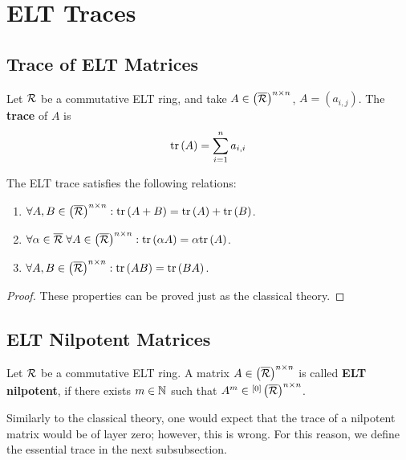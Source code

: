 \section{ELT Traces}
\subsection{Trace of ELT Matrices}
\begin{defn}
Let $\mathcal{R}$ be a commutative ELT ring, and take $A\in \left(\overline{\mathcal{R}}\right)^{n\times n}$, $A=\left(a_{i,j}\right)$. The \textbf{trace} of $A$ is
$$\textnormal{tr}\left(A\right)=\sum_{i=1}^{n}a_{i,i}$$
\end{defn}

\begin{lem}
The ELT trace satisfies the following relations:
\begin{enumerate}
\item $\forall A,B\in \left(\overline{\mathcal{R}}\right)^{n\times n}:\textnormal{tr}\left(A+B\right)=\textnormal{tr}\left(A\right)+\textnormal{tr}\left(B\right)$.
\item $\forall\alpha\in\overline{\mathcal{R}}\;\forall A\in \left(\overline{\mathcal{R}}\right)^{n\times n}:\textnormal{tr}\left(\alpha A\right)=\alpha\textnormal{tr}\left(A\right)$.
\item $\forall A,B\in \left(\overline{\mathcal{R}}\right)^{n\times n}:\textnormal{tr}\left(AB\right)=\textnormal{tr}\left(BA\right)$.
\end{enumerate}
\end{lem}
\begin{proof}
These properties can be proved just as the classical theory.
\end{proof}

\subsection{ELT Nilpotent Matrices}
\begin{defn}
Let $\mathcal{R}$ be a commutative ELT ring. A matrix $A\in \left(\overline{\mathcal{R}}\right)^{n\times n}$ is called \textbf{ELT nilpotent}, if there exists $m\in\mathbb{N}$ such that $A^m\in\overset{\left[0\right]}{}\left(\overline{\mathcal{R}}\right)^{n\times n}$.
\end{defn}

Similarly to the classical theory, one would expect that the trace of a nilpotent matrix would be of layer zero; however, this is wrong. For this
reason, we define the essential trace in the next subsubsection.

